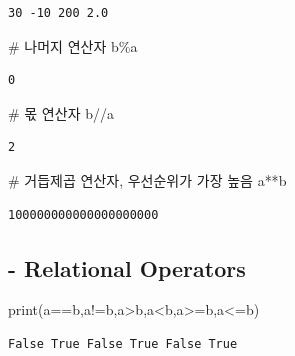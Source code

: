 \documentclass[
  a4paper,
  DIV=11,
  numbers=noendperiod]{scrreprt}
\newenvironment{Shaded}{\begin{snugshade}}{\end{snugshade}}
\newcommand{\BuiltInTok}[1]{\textcolor[rgb]{0.00,0.23,0.31}{#1}}
\newcommand{\CommentTok}[1]{\textcolor[rgb]{0.37,0.37,0.37}{#1}}
\newcommand{\NormalTok}[1]{\textcolor[rgb]{0.00,0.23,0.31}{#1}}
\newcommand{\OperatorTok}[1]{\textcolor[rgb]{0.37,0.37,0.37}{#1}}
\begin{document}
\begin{verbatim}
30 -10 200 2.0
\end{verbatim}

\begin{Shaded}
\begin{Highlighting}[]
\CommentTok{\# 나머지 연산자}
\NormalTok{b}\OperatorTok{\%}\NormalTok{a}
\end{Highlighting}
\end{Shaded}

\begin{verbatim}
0
\end{verbatim}

\begin{Shaded}
\begin{Highlighting}[]
\CommentTok{\# 몫 연산자}
\NormalTok{b}\OperatorTok{//}\NormalTok{a}
\end{Highlighting}
\end{Shaded}

\begin{verbatim}
2
\end{verbatim}

\begin{Shaded}
\begin{Highlighting}[]
\CommentTok{\# 거듭제곱 연산자, 우선순위가 가장 높음}
\NormalTok{a}\OperatorTok{**}\NormalTok{b}
\end{Highlighting}
\end{Shaded}

\begin{verbatim}
100000000000000000000
\end{verbatim}

\subsection{- Relational Operators}\label{relational-operators}

\begin{Shaded}
\begin{Highlighting}[]
\BuiltInTok{print}\NormalTok{(a}\OperatorTok{==}\NormalTok{b,a}\OperatorTok{!=}\NormalTok{b,a}\OperatorTok{\textgreater{}}\NormalTok{b,a}\OperatorTok{\textless{}}\NormalTok{b,a}\OperatorTok{\textgreater{}=}\NormalTok{b,a}\OperatorTok{\textless{}=}\NormalTok{b)}
\end{Highlighting}
\end{Shaded}

\begin{verbatim}
False True False True False True
\end{verbatim}
\end{document}
